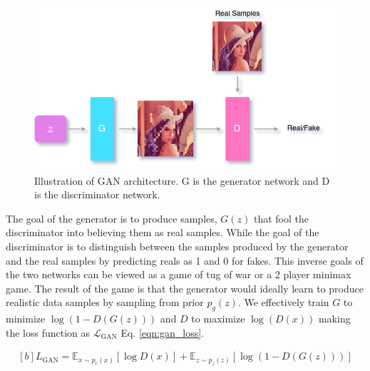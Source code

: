 \begin{figure}[!h]
    \centering
    \includegraphics[scale=0.4]{figures/gan_arch.png}
    \caption{Illustration of GAN architecture. G is the generator network and D is the discriminator network.}
    \label{fig:gan_arch}
\end{figure}

The goal of the generator is to produce samples, $G(z)$ that fool the discriminator into believing them as real samples. While the goal of the discriminator is to distinguish between the samples produced by the generator and the real samples by predicting reals as 1 and 0 for fakes. This inverse goals of the two networks can be viewed as a game of tug of war or a 2 player minimax game. The result of the game is that the generator would ideally learn to produce realistic data samples by sampling from prior $p_{g}(z)$. We effectively train $G$ to minimize $\log(1-D(G({z})))$ and $D$ to maximize $\log(D(x))$ making the loss function as $\mathcal{L}_{\mathrm{GAN}}$ Eq. \ref{eqn:gan_loss}.

\begin{equation} \label{eqn:gan_loss}
    \begin{gathered}[b]
        {L}_{\mathrm{GAN}}=\mathbb{E}_{{x} \sim p_{r}(x)}[\log D({x})]+\mathbb{E}_{{z} \sim p_{z}(z)}[\log (1-D(G({z})))]
    \end{gathered}
\end{equation}

